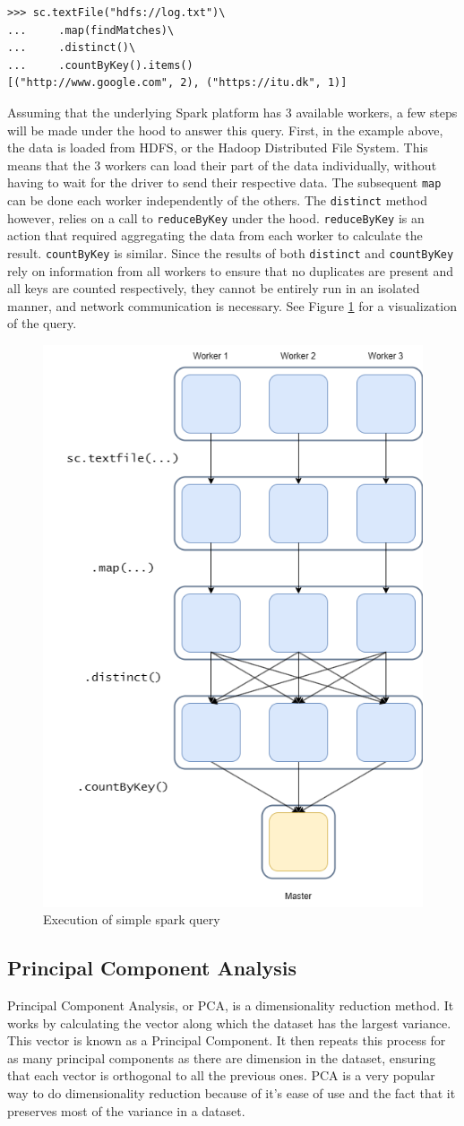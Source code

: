\begin{verbatim}
>>> sc.textFile("hdfs://log.txt")\
...     .map(findMatches)\
...     .distinct()\
...     .countByKey().items()
[("http://www.google.com", 2), ("https://itu.dk", 1)]
\end{verbatim}

Assuming that the underlying Spark platform has 3 available workers, a few steps will be made under the hood to answer this query. First, in the example above, the data is loaded from HDFS, or the Hadoop Distributed File System. This means that the 3 workers can load their part of the data individually, without having to wait for the driver to send their respective data. The subsequent \texttt{map} can be done each worker independently of the others. The \texttt{distinct} method however, relies on a call to \texttt{reduceByKey} under the hood. \texttt{reduceByKey} is an action that required aggregating the data from each worker to calculate the result. \texttt{countByKey} is similar. Since the results of both \texttt{distinct} and \texttt{countByKey} rely on information from all workers to ensure that no duplicates are present and all keys are counted respectively, they cannot be entirely run in an isolated manner, and network communication is necessary. See Figure \ref{fig:spark_execution} for a visualization of the query.

\begin{figure}
    \centering
    \includegraphics[width=0.3\linewidth]{images/death.drawio.png}
    \caption{Execution of simple spark query}
    \label{fig:spark_execution}
\end{figure}

\subsection{Principal Component Analysis}

Principal Component Analysis, or PCA, is a dimensionality reduction method. It works by calculating the vector along which the dataset has the largest variance. This vector is known as a Principal Component. It then repeats this process for as many principal components as there are dimension in the dataset, ensuring that each vector is orthogonal to all the previous ones. PCA is a very popular way to do dimensionality reduction because of it's ease of use and the fact that it preserves most of the variance in a dataset. 


